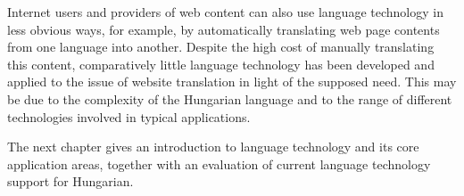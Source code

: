 \begin{multicols}{2}
Internet users and providers of web content can also use language technology in less obvious ways, for example, by automatically translating web page contents from one language into another. Despite the high cost of manually translating this content, comparatively little language technology has been developed and applied to the issue of website translation in light of the supposed need. This may be due to the complexity of the Hungarian language and to the range of different technologies involved in typical applications.  

The next chapter gives an introduction to language technology and its core application areas, together with an evaluation of current language technology support for Hungarian.
\end{multicols}

\clearpage



